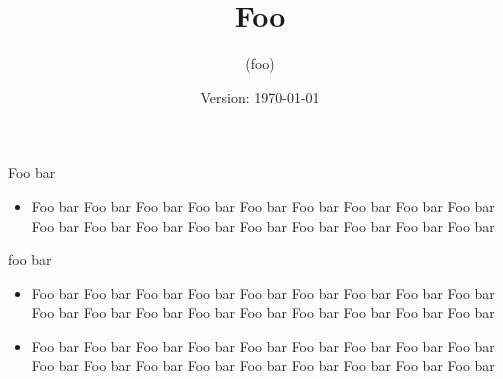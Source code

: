 \begin{slide}
\centerslidestrue
\begin{center}
\title{\LARGE Foo}
\author{(foo)}
\date{Version: \rm\today}
\maketitle

\vspace{2ex}
Foo bar\\

\end{center}
\end{slide}

\begin{itemize}
\item Foo bar Foo bar Foo bar Foo bar Foo bar Foo bar Foo bar Foo bar Foo bar
Foo bar Foo bar Foo bar Foo bar Foo bar Foo bar Foo bar Foo bar Foo bar
\end{itemize}

\pagebreak

\begin{slide}
foo bar
\end{slide}

\begin{itemize}
\item Foo bar Foo bar Foo bar Foo bar Foo bar Foo bar Foo bar Foo bar Foo bar
Foo bar Foo bar Foo bar Foo bar Foo bar Foo bar Foo bar Foo bar Foo bar
\item Foo bar Foo bar Foo bar Foo bar Foo bar Foo bar Foo bar Foo bar Foo bar
Foo bar Foo bar Foo bar Foo bar Foo bar Foo bar Foo bar Foo bar Foo bar
\end{itemize}

\endinput
